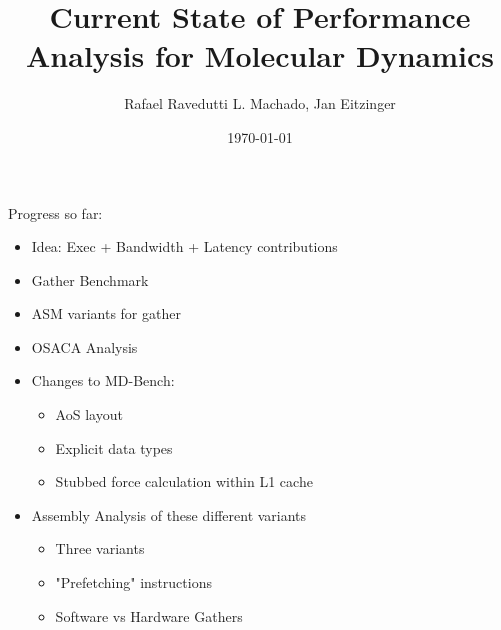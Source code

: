\documentclass[aspectratio=169,t]{beamer}
\title[MD Performance Analysis]{Current State of Performance Analysis for Molecular Dynamics}
\author[Rafael Ravedutti L. Machado, Jan Eitzinger]{Rafael Ravedutti L. Machado, Jan Eitzinger}
\institute[NHR@FAU]{Erlangen National High Performance Computing Center (NHR@FAU)}
\date{\today}
\begin{document}
  \maketitle

  { %
    \begin{frame}[noframenumbering]{Progress so far:}
        \begin{itemize}
            \item Idea: Exec + Bandwidth + Latency contributions
            \item Gather Benchmark
            \item ASM variants for gather
            \item OSACA Analysis
            \item Changes to MD-Bench:
            \begin{itemize}
                \item AoS layout
                \item Explicit data types
                \item Stubbed force calculation within L1 cache
            \end{itemize}
            \item Assembly Analysis of these different variants
            \begin{itemize}
                \item Three variants
                \item "Prefetching" instructions
                \item Software vs Hardware Gathers
            \end{itemize}
        \end{itemize}
    \end{frame}
  }

\end{document}
